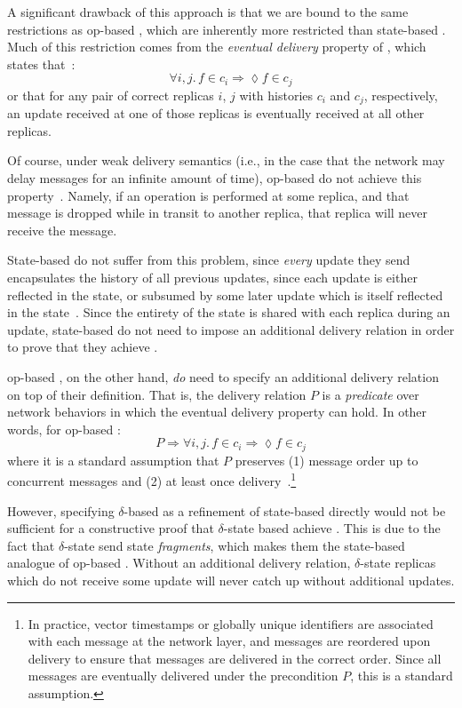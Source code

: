 A significant drawback of this approach is that we are bound to the same
restrictions as op-based \CRDTs, which are inherently more restricted than
state-based \CRDTs. Much of this restriction comes from the \emph{eventual
delivery} property of \EC, which states that~\citep{shapiro11}:
\[
  \forall i, j.\, f \in c_i \Rightarrow \lozenge f \in c_j
\]
or that for any pair of correct replicas $i$, $j$ with histories $c_i$ and
$c_j$, respectively, an update received at one of those replicas is eventually
received at all other replicas.

Of course, under weak delivery semantics (i.e., in the case that the network may
delay messages for an infinite amount of time), op-based \CRDTs do not achieve
this property~\citep{shapiro11}. Namely, if an operation is performed at some
replica, and that message is dropped while in transit to another replica, that
replica will never receive the message.

State-based \CRDTs do not suffer from this problem, since \emph{every} update
they send encapsulates the history of all previous updates, since each update is
either reflected in the state, or subsumed by some later update which is itself
reflected in the state~\citep{shapiro11}. Since the entirety of the state is
shared with each replica during an update, state-based \CRDTs do not need to
impose an additional delivery relation in order to prove that they achieve \SEC.

op-based \CRDTs, on the other hand, \emph{do} need to specify an additional
delivery relation on top of their definition. That is, the delivery relation $P$
is a \emph{predicate} over network behaviors in which the eventual delivery
property can hold. In other words, for op-based \CRDTs:
\[
  P \Rightarrow \forall i, j.\, f \in c_i \Rightarrow \lozenge f \in c_j
\]
where it is a standard assumption that $P$ preserves (1) message order up to
concurrent messages and (2) at least once delivery~\citep{shapiro11,
almedia18}.\footnote{In practice, vector timestamps or globally unique
identifiers are associated with each message at the network layer, and messages
are reordered upon delivery to ensure that messages are delivered in the correct
order. Since all messages are eventually delivered under the precondition $P$,
this is a standard assumption.}

However, specifying $\delta$-based \CRDTs as a refinement of state-based \CRDTs
directly would not be sufficient for a constructive proof that $\delta$-state
based \CRDTs achieve \SEC. This is due to the fact that $\delta$-state \CRDTs
send state \emph{fragments}, which makes them the state-based analogue of
op-based \CRDTs. Without an additional delivery relation, $\delta$-state \CRDT
replicas which do not receive some update will never catch up without additional
updates.

